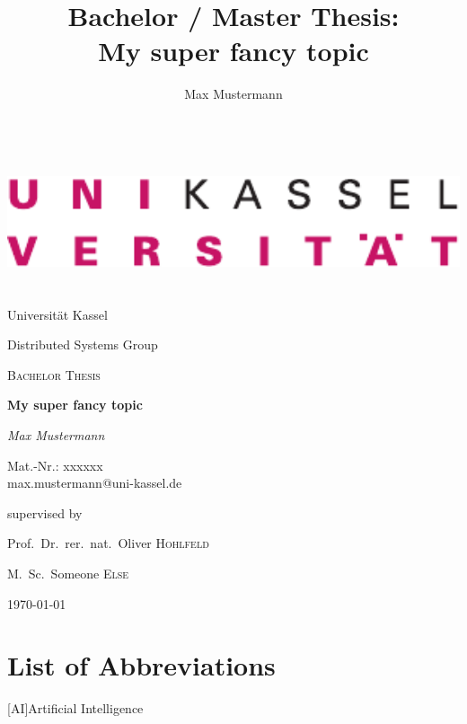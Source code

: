 \documentclass[a4paper, 11pt, twoside]{article}
\title{Bachelor / Master Thesis:\\My super fancy topic}
\author{Max Mustermann}
\newcommand{\frontmatter}{
	\cleardoublepage
	\pagenumbering{Roman}
	\setcounter{page}{1}
}
\begin{document}
\begin{titlepage}
	\centering
	\includegraphics[width=0.4\linewidth, height=4cm,keepaspectratio=true]{./figures/uk-logo.pdf}\par\vspace{1cm}
	{\LARGE Universität Kassel\par}
	\vspace{0.5cm}
	{\Large Distributed Systems Group\par}
	\vspace{4cm}
	{\scshape\Large Bachelor Thesis\par}
	\vspace{1.5cm}
	{\huge\bfseries My super fancy topic\par}
	\vspace{2cm}
	{\Large\itshape Max Mustermann\par}
	\vspace{0.5cm}
	{\large Mat.-Nr.: xxxxxx\\max.mustermann@uni-kassel.de\par}
	\vfill
	supervised by\par
	Prof.~Dr.~rer.~nat.~Oliver \textsc{Hohlfeld}\par
	M.\ Sc.~Someone \textsc{Else}

	\vfill

	{\large \today\par}
\end{titlepage}

\newpage
\afterpage{
\thispagestyle{empty}
\mbox{}
}

\frontmatter
\newpage
\acresetall
\cleardoublepage


\newpage
\cleardoublepage
\tableofcontents

\newpage
\cleardoublepage
\setcounter{secnumdepth}{0}
\section{List of Abbreviations}


\begin{acronym}[DT]
	[AI]{Artificial Intelligence}
\end{acronym}
\end{document}
